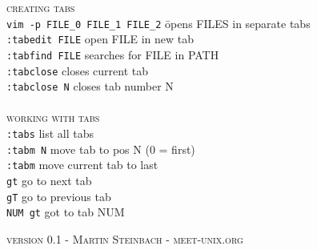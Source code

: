 \documentclass[a4paper,10pt]{scrartcl}
\begin{document}
\begin{multicols}{2}
\begin{tabbing}
\end{tabbing}


\end{multicols}


\begin{tabbing}
\large{\textsc{creating tabs}}\\
\texttt{vim -p FILE\_0 FILE\_1 FILE\_2}	\hspace{0.5 cm}\= opens FILES in separate tabs\\
\texttt{:tabedit FILE}					\> open FILE in new tab\\
\texttt{:tabfind FILE}					\> searches for FILE in PATH\\
\texttt{:tabclose}						\> closes current tab\\
\texttt{:tabclose N}					\> closes tab number  N\\\\

\large{\textsc{working with tabs}}\\
\texttt{:tabs}			\> list all tabs\\
\texttt{:tabm N}		\> move tab to pos N (0 = first)\\
\texttt{:tabm}			\> move current tab to last\\
\texttt{gt}				\> go to next tab\\
\texttt{gT}				\> go to previous tab\\
\texttt{NUM gt}			\> got to tab NUM\\
\end{tabbing}

\centering\textsc{version 0.1 - Martin Steinbach - meet-unix.org}
\end{document}
